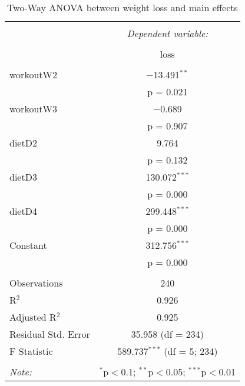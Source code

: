 
\begin{table}[!htbp] \centering 
  \caption{Two-Way ANOVA between weight loss and main effects} 
  \label{tab::main_2} 
\begin{tabular}{@{\extracolsep{5pt}}lc} 
\\[-1.8ex]\hline 
\hline \\[-1.8ex] 
 & \multicolumn{1}{c}{\textit{Dependent variable:}} \\ 
\cline{2-2} 
\\[-1.8ex] & loss \\ 
\hline \\[-1.8ex] 
 workoutW2 & $-$13.491$^{**}$ \\ 
  & p = 0.021 \\ 
  workoutW3 & $-$0.689 \\ 
  & p = 0.907 \\ 
  dietD2 & 9.764 \\ 
  & p = 0.132 \\ 
  dietD3 & 130.072$^{***}$ \\ 
  & p = 0.000 \\ 
  dietD4 & 299.448$^{***}$ \\ 
  & p = 0.000 \\ 
  Constant & 312.756$^{***}$ \\ 
  & p = 0.000 \\ 
 \hline \\[-1.8ex] 
Observations & 240 \\ 
R$^{2}$ & 0.926 \\ 
Adjusted R$^{2}$ & 0.925 \\ 
Residual Std. Error & 35.958 (df = 234) \\ 
F Statistic & 589.737$^{***}$ (df = 5; 234) \\ 
\hline 
\hline \\[-1.8ex] 
\textit{Note:}  & \multicolumn{1}{r}{$^{*}$p$<$0.1; $^{**}$p$<$0.05; $^{***}$p$<$0.01} \\ 
\end{tabular} 
\end{table} 
